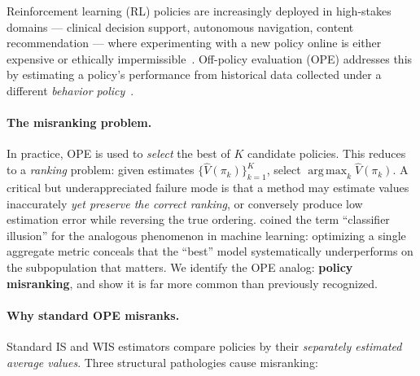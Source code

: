 \documentclass[10pt]{article}
\theoremstyle{plain}
\theoremstyle{definition}
\theoremstyle{remark}
\DeclareMathOperator*{\argmax}{arg\,max}
\begin{document}
Reinforcement learning (RL) policies are increasingly deployed in high-stakes
domains --- clinical decision support, autonomous navigation, content
recommendation --- where experimenting with a new policy online is either
expensive or ethically impermissible~\citep{levine2020offline,nie2021learning}.
Off-policy evaluation (OPE) addresses this by estimating a policy's performance
from historical data collected under a different \emph{behavior
policy}~\citep{precup2000eligibility,sutton2018reinforcement}.

\paragraph{The misranking problem.}
In practice, OPE is used to \emph{select} the best of $K$ candidate policies.
This reduces to a \emph{ranking} problem: given estimates
$\{\hat{V}(\pi_k)\}_{k=1}^K$, select $\argmax_k \hat{V}(\pi_k)$.  A critical
but underappreciated failure mode is that a method may estimate values
inaccurately \emph{yet preserve the correct ranking}, or conversely produce
low estimation error while reversing the true ordering.  \citet{hand2006classifier}
coined the term ``classifier illusion'' for the analogous phenomenon in machine
learning: optimizing a single aggregate metric conceals that the ``best''
model systematically underperforms on the subpopulation that matters.  We
identify the OPE analog: \textbf{policy misranking}, and show it is far more
common than previously recognized.

\paragraph{Why standard OPE misranks.}
Standard IS and WIS estimators compare policies by their \emph{separately
estimated average values}.  Three structural pathologies cause misranking:
\end{document}
